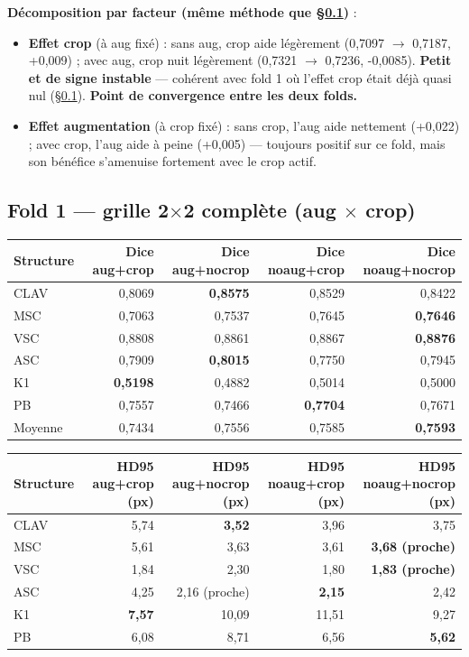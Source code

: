 \textbf{Décomposition par facteur (même méthode que \S\ref{sec:phase1-fold1-grid})} :

\begin{itemize}[nosep]
    \item \textbf{Effet crop} (à aug fixé) : sans aug, crop aide légèrement
        (0,7097 $\to$ 0,7187, +0,009) ; avec aug, crop nuit légèrement
        (0,7321 $\to$ 0,7236, -0,0085). \textbf{Petit et de signe instable} ---
        cohérent avec fold 1 où l'effet crop était déjà quasi nul
        (\S\ref{sec:phase1-fold1-grid}). \textbf{Point de convergence entre les deux
        folds.}
    \item \textbf{Effet augmentation} (à crop fixé) : sans crop, l'aug aide nettement
        (+0,022) ; avec crop, l'aug aide à peine (+0,005) --- toujours positif sur ce
        fold, mais son bénéfice s'amenuise fortement avec le crop actif.
\end{itemize}

\subsection{Fold 1 --- grille 2$\times$2 complète (aug $\times$ crop)}
\label{sec:phase1-fold1-grid}

\begin{center}
\begin{tabular}{lrrrr}
\toprule
Structure & Dice aug+crop & Dice aug+nocrop & Dice noaug+crop & Dice noaug+nocrop \\
\midrule
CLAV & 0,8069 & \textbf{0,8575} & 0,8529 & 0,8422 \\
MSC  & 0,7063 & 0,7537 & 0,7645 & \textbf{0,7646} \\
VSC  & 0,8808 & 0,8861 & 0,8867 & \textbf{0,8876} \\
ASC  & 0,7909 & \textbf{0,8015} & 0,7750 & 0,7945 \\
K1   & \textbf{0,5198} & 0,4882 & 0,5014 & 0,5000 \\
PB   & 0,7557 & 0,7466 & \textbf{0,7704} & 0,7671 \\
\midrule
Moyenne & 0,7434 & 0,7556 & 0,7585 & \textbf{0,7593} \\
\bottomrule
\end{tabular}
\end{center}

\begin{center}
\begin{tabular}{lrrrr}
\toprule
Structure & HD95 aug+crop (px) & HD95 aug+nocrop (px) & HD95 noaug+crop (px) & HD95 noaug+nocrop (px) \\
\midrule
CLAV & 5,74 & \textbf{3,52} & 3,96 & 3,75 \\
MSC  & 5,61 & 3,63 & 3,61 & \textbf{3,68 (proche)} \\
VSC  & 1,84 & 2,30 & 1,80 & \textbf{1,83 (proche)} \\
ASC  & 4,25 & 2,16 (proche) & \textbf{2,15} & 2,42 \\
K1   & \textbf{7,57} & 10,09 & 11,51 & 9,27 \\
PB   & 6,08 & 8,71 & 6,56 & \textbf{5,62} \\
\bottomrule
\end{tabular}
\end{center}

